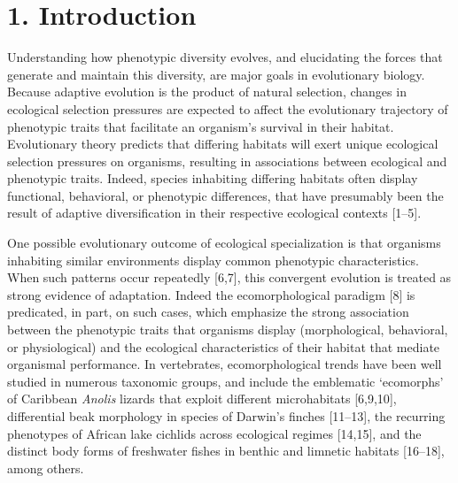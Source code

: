 \documentclass[
  11pt,
]{article}
\begin{document}
\newpage

\hypertarget{introduction}{%
\section{1. Introduction}\label{introduction}}

Understanding how phenotypic diversity evolves, and elucidating the
forces that generate and maintain this diversity, are major goals in
evolutionary biology. Because adaptive evolution is the product of
natural selection, changes in ecological selection pressures are
expected to affect the evolutionary trajectory of phenotypic traits that
facilitate an organism's survival in their habitat. Evolutionary theory
predicts that differing habitats will exert unique ecological selection
pressures on organisms, resulting in associations between ecological and
phenotypic traits. Indeed, species inhabiting differing habitats often
display functional, behavioral, or phenotypic differences, that have
presumably been the result of adaptive diversification in their
respective ecological contexts {[}1--5{]}. \hfill\break

One possible evolutionary outcome of ecological specialization is that
organisms inhabiting similar environments display common phenotypic
characteristics. When such patterns occur repeatedly {[}6,7{]}, this
convergent evolution is treated as strong evidence of adaptation. Indeed
the ecomorphological paradigm {[}8{]} is predicated, in part, on such
cases, which emphasize the strong association between the phenotypic
traits that organisms display (morphological, behavioral, or
physiological) and the ecological characteristics of their habitat that
mediate organismal performance. In vertebrates, ecomorphological trends
have been well studied in numerous taxonomic groups, and include the
emblematic `ecomorphs' of Caribbean \emph{Anolis} lizards that exploit
different microhabitats {[}6,9,10{]}, differential beak morphology in
species of Darwin's finches {[}11--13{]}, the recurring phenotypes of
African lake cichlids across ecological regimes {[}14,15{]}, and the
distinct body forms of freshwater fishes in benthic and limnetic
habitats {[}16--18{]}, among others. \hfill\break
\end{document}
